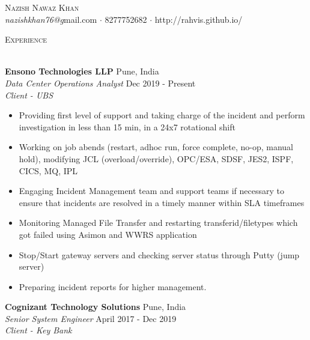 \documentclass[a4paper]{article}
\newcommand{\lineunder} {
    \vspace*{-8pt} \\
    \hspace*{-18pt} \hrulefill \\
}
\newcommand{\header} [1] {
    {\hspace*{-18pt}\vspace*{6pt} \textsc{#1}}
    \vspace*{-6pt} \lineunder
}
\begin{document}
\vspace*{-40pt}

    

\vspace*{-10pt}
\begin{center}
	{\Huge \scshape {Nazish Nawaz Khan}}\\
	\vspace{2mm}
	{\emph{nazishkhan76@g}}mail.com $\cdot$ 8277752682 $\cdot$ http://rahvis.github.io/\\
\end{center}

{\color{blue}\header{Experience}}

\vspace{1mm}

\textbf{Ensono Technologies LLP} \hfill Pune, India\\
\textit{Data Center Operations Analyst} \hfill Dec 2019 - Present\\
\textit{Client - UBS} 
\vspace{-1mm}
\justify
\begin{itemize} \itemsep 1pt

	\item Providing first level of support and taking charge of the incident and perform investigation in less than 15 min, in a 24x7 rotational shift
	\item Working on job abends (restart, adhoc run, force complete, no-op, manual hold), modifying JCL (overload/override), OPC/ESA, SDSF, JES2, ISPF, CICS, MQ, IPL
	\item Engaging Incident Management team and support teams if necessary to ensure that incidents are resolved in a timely manner within SLA timeframes 
	\item Monitoring Managed File Transfer and restarting transferid/filetypes which got failed using Asimon and WWRS application
	\item Stop/Start gateway servers and checking server status through Putty (jump server)
           \item Preparing incident reports for higher management.
\end{itemize}
\vspace{2mm}
\textbf{Cognizant Technology Solutions} \hfill Pune, India\\
\textit{Senior System Engineer} \hfill April 2017 - Dec 2019\\
\textit{Client - Key Bank} 
\vspace{-1mm}
\justify
\end{document}
